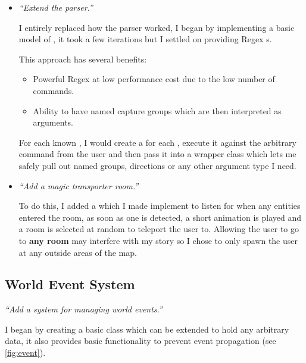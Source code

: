 \documentclass{article}
\begin{document}
\begin{multicols}{2}
\begin{itemize}[leftmargin=*]
                \item \textit{``Extend the parser.''}
                
                    I entirely replaced how the parser worked, I began by implementing a basic model of , it took a few iterations but I settled on providing Regex s.

                    This approach has several benefits:

                    \begin{itemize}[leftmargin=*]
                        \item Powerful Regex at low performance cost due to the low number of commands.
                        \item Ability to have named capture groups which are then interpreted as arguments.
                    \end{itemize}

                    For each known , I would create a  for each , execute it against the arbitrary command from the user and then pass it into a wrapper class  which lets me safely pull out named groups, directions or any other argument type I need.
                
                \item \textit{``Add a magic transporter room.''}
                
                    To do this, I added a  which I made implement  to listen for when any entities entered the room, as soon as one is detected, a short animation is played and a room is selected at random to teleport the user to. Allowing the user to go to \textbf{any room} may interfere with my story so I chose to only spawn the user at any outside areas of the map.
                \end{itemize}

                \subsection{World Event System}
                \textit{``Add a system for managing world events.''}

                    I began by creating a basic  class which can be extended to hold any arbitrary data, it also provides basic functionality to prevent event propagation (see \autoref{fig:event}).


\end{multicols}
\end{document}
